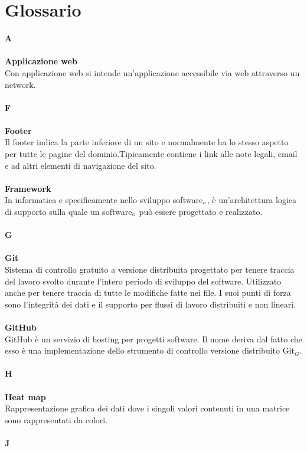 \chapter{Glossario} \label{Glossario}
\textbf{A} \\
\\
\textbf{Applicazione web} \\
Con applicazione web si intende un'applicazione accessibile via web attraverso un network. \\
\\
\textbf{F} \\
\\
\textbf{Footer} \\
Il footer indica la parte inferiore di un sito e normalmente ha lo stesso aspetto per tutte le pagine del dominio.Tipicamente contiene i link alle note legali, email  e ad altri elementi di navigazione del sito. \\
\\
\textbf{Framework} \\
In informatica e specificamente nello sviluppo software$_{\scaleto{G}{3pt}}$, è un'architettura logica di supporto sulla quale un software$_{\scaleto{G}{3pt}}$ può essere progettato e realizzato.\\
\\
\textbf{G} \\
\\
\textbf{Git}\\
Sistema di controllo gratuito a versione distribuita progettato per tenere traccia del lavoro svolto durante l'intero periodo di sviluppo del software.
Utilizzato anche per tenere traccia di tutte le modifiche fatte nei file.
I suoi punti di forza sono l'integrità dei dati e il supporto per flussi di lavoro distribuiti e non lineari.\\
\\
\textbf{GitHub} \\
GitHub è un servizio di hosting per progetti software. Il nome deriva dal fatto che esso è una implementazione dello strumento di controllo versione distribuito Git$_G$. \\
\\
\textbf{H} \\
\\
\textbf{Heat map} \\
 Rappresentazione grafica dei dati dove i singoli valori contenuti in una matrice sono rappresentati da colori. \\
\\
\textbf{J} \\
